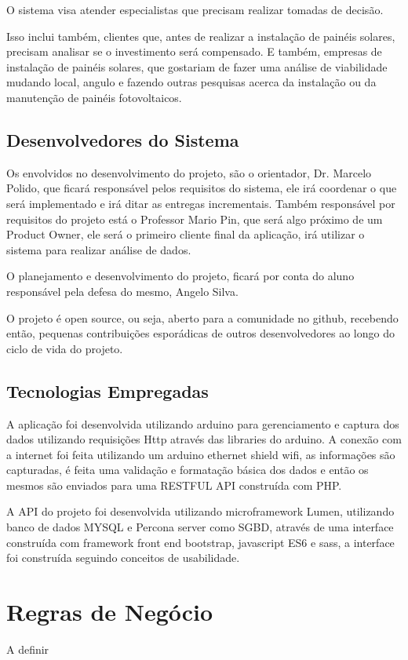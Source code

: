 O sistema visa atender especialistas que precisam realizar tomadas de decisão.

Isso inclui também, clientes que, antes de realizar a instalação de painéis solares, precisam analisar se o investimento será compensado. E também, empresas de instalação de painéis solares, que gostariam de fazer uma análise de viabilidade mudando local, angulo e fazendo outras pesquisas acerca da instalação ou da manutenção de painéis fotovoltaicos.

\subsection{Desenvolvedores do Sistema}

Os envolvidos no desenvolvimento do projeto, são o orientador, Dr. Marcelo Polido, que ficará responsável pelos requisitos do sistema, ele irá coordenar o que será implementado e irá ditar as entregas incrementais. Também responsável por requisitos do projeto está o Professor Mario Pin, que será algo próximo de um Product Owner, ele será o primeiro cliente final da aplicação, irá utilizar o sistema para realizar análise de dados.

O planejamento e desenvolvimento do projeto, ficará por conta do aluno responsável pela defesa do mesmo, Angelo Silva.

O projeto é open source, ou seja, aberto para a comunidade no github, recebendo então, pequenas contribuições esporádicas de outros desenvolvedores ao longo do ciclo de vida do projeto.

\subsection{Tecnologias Empregadas}

A aplicação foi desenvolvida utilizando arduino para gerenciamento e captura dos dados utilizando requisições Http através das libraries do arduino. A conexão com a internet foi feita utilizando um arduino ethernet shield wifi, as informações são capturadas, é feita uma validação e formatação básica dos dados e então os mesmos são enviados para uma RESTFUL API construída com PHP.

A API do projeto foi desenvolvida utilizando microframework Lumen, utilizando banco de dados MYSQL e Percona server como SGBD, através de uma interface construída com framework front end bootstrap, javascript ES6 e sass, a interface foi construída seguindo conceitos de usabilidade.

\section{Regras de Negócio}

A definir
